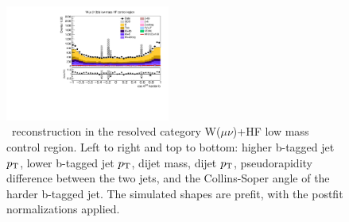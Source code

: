 \begin{figure}[tbp]
\begin{center}
    \includegraphics[width=0.48\textwidth]{figures/wlnhbb2016/resolved/WmnWHHeavyFlavorCRLowMass_hbbCosThetaCSJ1.pdf}
    \caption{\HBB\ reconstruction in the resolved category W($\mu\nu$)+HF low mass control region.
    Left to right and top to bottom: higher b-tagged jet $p_{\mathrm{T}}$, lower b-tagged jet $p_{\mathrm{T}}$, dijet mass, dijet $p_{\mathrm{T}}$, 
    pseudorapidity difference between the two jets, and the Collins-Soper angle of the harder b-tagged jet.
    The simulated shapes are prefit, with the postfit normalizations applied.}
    \label{fig:res_WmnHFLowMass_Hbb}
  \end{center}
\end{figure}
\clearpage


